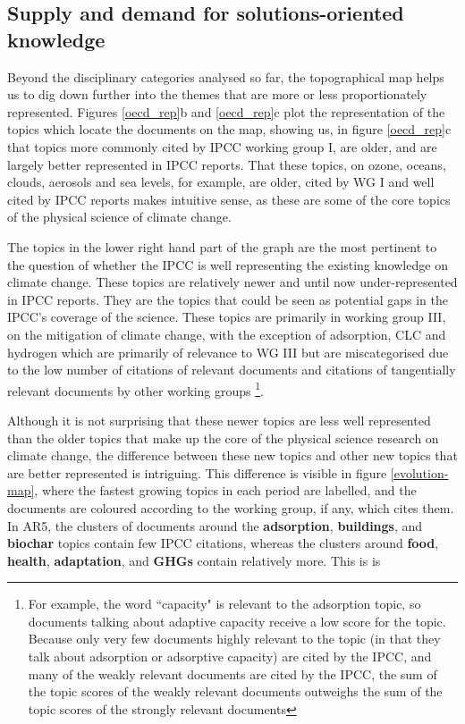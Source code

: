 \documentclass{article}
\begin{document}
\begin{linenumbers}
\subsection*{Supply and demand for solutions-oriented knowledge}

Beyond the disciplinary categories analysed so far, the topographical map helps us to dig down further into the themes that are more or less proportionately represented. Figures \ref{oecd_rep}b and \ref{oecd_rep}c plot the representation of the topics which locate the documents on the map, showing us, in figure \ref{oecd_rep}c that topics more commonly cited by IPCC working group I, are older, and are largely better represented in IPCC reports. That these topics, on ozone, oceans, clouds, aerosols and sea levels, for example, are older, cited by WG I and well cited by IPCC reports makes intuitive sense, as these are some of the core topics of the physical science of climate change.

The topics in the lower right hand part of the graph are the most pertinent to the question of whether the IPCC is well representing the existing knowledge on climate change. These topics are relatively newer and until now under-represented in IPCC reports. They are the topics that could be seen as potential gaps in the IPCC's coverage of the science. These topics are primarily in working group III, on the mitigation of climate change, with the exception of adsorption, CLC and hydrogen which are primarily of relevance to WG III but are miscategorised due to the low number of citations of relevant documents and citations of tangentially relevant documents by other working groups \footnote{For example, the word ``capacity" is relevant to the adsorption topic, so documents talking about adaptive capacity receive a low score for the topic. Because only very few documents highly relevant to the topic (in that they talk about adsorption or adsorptive capacity) are cited by the IPCC, and many of the weakly relevant documents are cited by the IPCC, the sum of the topic scores of the weakly relevant documents outweighs the sum of the topic scores of the strongly relevant documents}.

Although it is not surprising that these newer topics are less well represented than the older topics that make up the core of the physical science research on climate change, the difference between these new topics and other new topics that are better represented is intriguing. This difference is visible in figure \ref{evolution-map}, where the fastest growing topics in each period are labelled, and the documents are coloured according to the working group, if any, which cites them. In AR5, the clusters of documents around the \textbf{adsorption}, \textbf{buildings}, and \textbf{biochar} topics contain few IPCC citations, whereas the clusters around \textbf{food}, \textbf{health}, \textbf{adaptation}, and \textbf{GHGs} contain relatively more. This is is



\end{linenumbers}
\end{document}
